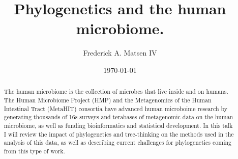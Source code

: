 \documentclass{amsart}
\newcommand{\forarxiv}[1]{#1}
\newcommand{\notforarxiv}[1]{}
\begin{document}
\notforarxiv{
\begin{flushright}
Version dated: \today
\end{flushright}
\bigskip
\noindent RH: PHYLOGENETICS AND THE HUMAN MICROBIOME
\bigskip
\medskip
\begin{center}

\noindent{\Large \bf Phylogenetics and the human microbiome.}
\bigskip

\noindent {\normalsize \sc
Frederick A. Matsen IV$^1$}\\
\noindent {\small \it
$^1$
Program in Computational Biology, Fred Hutchinson Cancer Research Center, Seattle, WA, 91802, USA}\\
\end{center}
\medskip
\noindent{\bf Corresponding author:} Frederick A Matsen, Program in Computational Biology, Fred Hutchinson Cancer Research Center, Seattle, WA, 91802, USA; E-mail: matsen@fhcrc.org.\\
\vspace{1in}
}

\forarxiv{\
\title{Phylogenetics and the human microbiome.}
\author{Frederick A. Matsen IV}
\date{\today}
\begin{abstract}
}
\notforarxiv{
\subsubsection{Abstract}
}

The human microbiome is the collection of microbes that live inside and on humans.
The Human Microbiome Project (HMP) and the Metagenomics of the Human Intestinal Tract (MetaHIT) consortia have advanced human microboime research by generating thousands of 16s surveys and terabases of metagenomic data on the human microbiome, as well as funding bioinformatics and statistical development.
In this talk I will review the impact of phylogenetics and tree-thinking on the methods used in the analysis of this data, as well as describing current challenges for phylogenetics coming from this type of work.

\forarxiv{
\end{abstract}
\maketitle
}

\notforarxiv{
\noindent (Keywords: human microbiome; microbial ecology; phylogenetic methods; review)\\
\vspace{1.5in}
}
\end{document}
